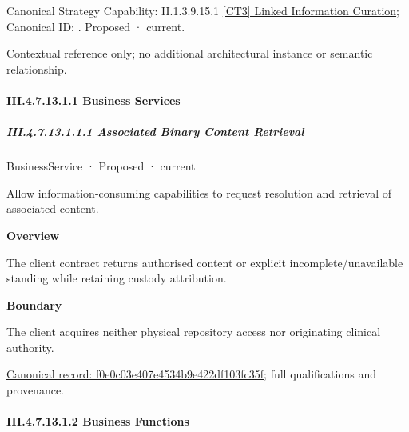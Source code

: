 {\small Canonical Strategy Capability: II.1.3.9.15.1 \hyperref[element:5edb2a8b5ee54ddda8104d1fab323a94]{[CT3] Linked Information Curation}; Canonical ID: \texttt{}. Proposed · current.}\par
Contextual reference only; no additional architectural instance or semantic relationship.\par
\paragraph*{III.4.7.13.1.1 Business Services}
\label{navigation:III.4.7.13.1.1}

\subparagraph*{III.4.7.13.1.1.1 Associated Binary Content Retrieval}
\label{navigation:III.4.7.13.1.1.1}

\label{element:f0e0c03e407e4534b9e422df103fc35f}
{\small BusinessService · Proposed · current}\par

Allow information-consuming capabilities to request resolution and retrieval of associated content.



\textbf{Overview}



The client contract returns authorised content or explicit incomplete/unavailable standing while retaining custody attribution.



\textbf{Boundary}



The client acquires neither physical repository access nor originating clinical authority.


{\footnotesize \href{../../../../continuum/business/business-service/f0e0c03e407e4534b9e422df103fc35f.md}{Canonical record: f0e0c03e407e4534b9e422df103fc35f}; full qualifications and provenance.}\par
\paragraph*{III.4.7.13.1.2 Business Functions}
\label{navigation:III.4.7.13.1.2}

